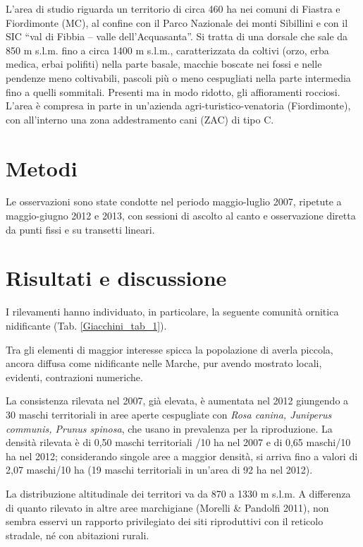L{\textquoteright}area di studio riguarda un territorio di circa 460 ha
nei comuni di Fiastra e Fiordimonte (MC), al confine con il Parco
Nazionale dei monti Sibillini e con il SIC {\textquotedblleft}val di
Fibbia -- valle dell{\textquoteright}Acquasanta{\textquotedblright}. Si
tratta di una dorsale che sale da 850 m s.l.m. fino a circa 1400 m
s.l.m., caratterizzata da coltivi (orzo, erba medica, erbai polifiti)
nella parte basale, macchie boscate nei fossi e nelle pendenze meno
coltivabili, pascoli pi\`u o meno cespugliati nella parte intermedia
fino a quelli sommitali. Presenti ma in modo ridotto, gli affioramenti
rocciosi.
L{\textquoteright}area \`e compresa in parte in
un{\textquoteright}azienda agri-turistico-venatoria (Fiordimonte), con
all{\textquoteright}interno una zona addestramento cani (ZAC) di tipo
C. 

\section*{Metodi}

Le osservazioni sono state condotte nel periodo maggio-luglio 2007,
ripetute a maggio-giugno 2012 e 2013, con sessioni di ascolto al canto
e osservazione diretta da punti fissi e su transetti lineari. 

\section*{Risultati e discussione}

I rilevamenti hanno individuato, in particolare, la seguente comunit\`a
ornitica nidificante (Tab. \ref{Giacchini_tab_1}).

Tra gli elementi di maggior interesse spicca la popolazione di averla
piccola, ancora diffusa come nidificante nelle Marche, pur avendo
mostrato locali, evidenti, contrazioni numeriche. 

La consistenza rilevata nel 2007, gi\`a elevata, \`e aumentata nel 2012
giungendo a 30 maschi territoriali in aree aperte cespugliate con
\textit{Rosa canina, Juniperus communis, Prunus spinosa}, che usano in
prevalenza per la riproduzione. La densit\`a rilevata \`e di 0,50
maschi territoriali /10 ha nel 2007 e di 0,65 maschi/10 ha nel 2012;
considerando singole aree a maggior densit\`a, si arriva fino a valori
di 2,07 maschi/10 ha (19 maschi territoriali in un{\textquoteright}area
di 92 ha nel 2012). 

La distribuzione altitudinale dei territori va da 870 a 1330 m s.l.m. A
differenza di quanto rilevato in altre aree marchigiane (Morelli \&
Pandolfi 2011), non sembra esservi un rapporto privilegiato dei siti
riproduttivi con il reticolo stradale, n\'e con abitazioni rurali. 

